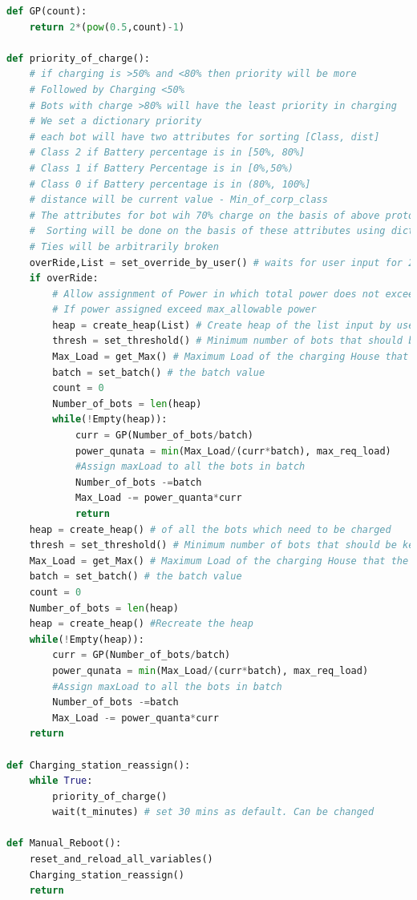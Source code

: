 \documentclass{article}
\begin{document}
\begin{lstlisting}[language=Python, caption=Protocol allowing the charging of bots efficiently]
def GP(count):
	return 2*(pow(0.5,count)-1)

def priority_of_charge():
	# if charging is >50% and <80% then priority will be more
	# Followed by Charging <50%
	# Bots with charge >80% will have the least priority in charging
	# We set a dictionary priority
	# each bot will have two attributes for sorting [Class, dist]
	# Class 2 if Battery percentage is in [50%, 80%]
	# Class 1 if Battery Percentage is in [0%,50%)
	# Class 0 if Battery percentage is in (80%, 100%]
	# distance will be current value - Min_of_corp_class
	# The attributes for bot wih 70% charge on the basis of above protocol will be (2,10)
	#  Sorting will be done on the basis of these attributes using dictionary comparison
	# Ties will be arbitrarily broken
	overRide,List = set_override_by_user() # waits for user input for 2mins of inactivity. If no action taken during 2 mins, overRide is automatically set as false and list is set as empty.
	if overRide:
		# Allow assignment of Power in which total power does not exceed the maxallowable power.
		# If power assigned exceed max_allowable power
		heap = create_heap(List) # Create heap of the list input by user
		thresh = set_threshold() # Minimum number of bots that should be kept on charging
		Max_Load = get_Max() # Maximum Load of the charging House that the grid can hold
		batch = set_batch() # the batch value 
		count = 0
		Number_of_bots = len(heap)
		while(!Empty(heap)):
			curr = GP(Number_of_bots/batch)
			power_qunata = min(Max_Load/(curr*batch), max_req_load)
			#Assign maxLoad to all the bots in batch
			Number_of_bots -=batch
			Max_Load -= power_quanta*curr
			return 
	heap = create_heap() # of all the bots which need to be charged
	thresh = set_threshold() # Minimum number of bots that should be kept on charging
	Max_Load = get_Max() # Maximum Load of the charging House that the grid can hold
	batch = set_batch() # the batch value 
	count = 0
	Number_of_bots = len(heap)
	heap = create_heap() #Recreate the heap
	while(!Empty(heap)):
		curr = GP(Number_of_bots/batch)
		power_qunata = min(Max_Load/(curr*batch), max_req_load)
		#Assign maxLoad to all the bots in batch
		Number_of_bots -=batch
		Max_Load -= power_quanta*curr
	return

def Charging_station_reassign():
	while True:
        priority_of_charge()
		wait(t_minutes) # set 30 mins as default. Can be changed

def Manual_Reboot():
	reset_and_reload_all_variables()
	Charging_station_reassign()
	return


\end{lstlisting}
\end{document}
